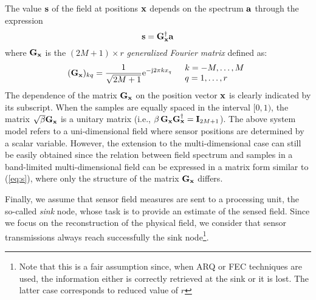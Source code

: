 \documentclass[final, a4paper]{IEEEtran}
\newcommand{\ee}{{\rm e}}
\newcommand{\jj}{{\rm j}}  \newcommand{\ii}{{\rm i}}  \newcommand{\dd}{{\rm\,d}}
\newcommand{\av}{{\bf a}}
\newcommand{\sv}{{\bf s}}
\newcommand{\xv}{{\bf x}}
\newcommand{\Gm}{{\bf G}}
\newcommand{\Id}{{\bf I}}
\begin{document}
The value $\sv$ of the field at positions $\xv$ depends on the spectrum $\av$
through the expression
\begin{equation}
\sv =\Gm_\xv\Herm\av
\label{eq:s}
\end{equation}
where $\Gm_\xv$ is the $(2M+1)\times r$
{\em generalized Fourier matrix} defined as:
\begin{equation}
(\Gm_\xv)_{kq}=\frac{1}{\sqrt{2M+1}}\ee^{-\jj 2\pi  k x_q}~~~
\begin{array}{l} k= -M,\ldots, M \\
q=1,\ldots,r\end{array}
\label{eq:F}
\end{equation}
The dependence of the matrix $\Gm_\xv$ on the position vector $\xv$
is clearly indicated by its subscript.
When the samples are equally spaced in the interval $[0,1)$,
the matrix $\sqrt{\beta}\Gm_{\xv}$ is a unitary matrix
(i.e., $\beta\,\Gm_{\xv}\Gm^{\dagger}_{\xv}=\Id_{2M+1}$).
The above system model refers to a uni-dimensional
field where sensor positions are determined by a scalar variable.
However, the extension to the multi-dimensional case can still be
easily obtained since the relation between field spectrum and
samples in a band-limited multi-dimensional field can be expressed
in a matrix form similar to (\ref{eq:s}), where only the structure
of the matrix $\Gm_\xv$ differs.

Finally, we assume that sensor field measures are sent to a processing unit,
the so-called {\em sink} node, whose task is to provide an estimate
of the sensed field.
Since we focus on the reconstruction of the physical field,
we consider that sensor transmissions always reach successfully the sink node\footnote{Note that this is a fair assumption since, when ARQ or FEC techniques are used, the information either
is correctly retrieved at the sink or it is lost. The latter case corresponds to reduced value of $r$
}.
\end{document}
